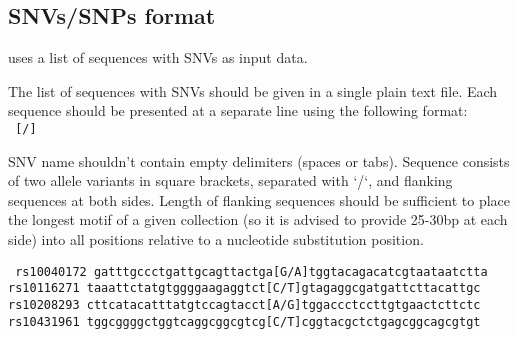 \subsection{SNVs/SNPs format}
 uses a list of sequences with SNVs as input data.

The list of sequences with SNVs should be given in a single plain text file. 
Each sequence should be presented at a separate line using the following format:\\
\texttt{ [/]}

SNV name shouldn't contain empty delimiters (spaces or tabs). 
Sequence consists of two allele variants in square brackets, separated with `/`, and flanking sequences at both sides. Length of flanking sequences should be sufficient to place the longest motif of a given collection (so it is advised to provide 25-30bp at each side) into all positions relative to a nucleotide substitution position. 

\noindent\texttt{%
rs10040172 gatttgccctgattgcagttactga[G/A]tggtacagacatcgtaataatctta
rs10116271 taaattctatgtggggaagaggtct[C/T]gtagaggcgatgattcttacattgc
rs10208293 cttcatacatttatgtccagtacct[A/G]tggaccctccttgtgaactcttctc
rs10431961 tggcggggctggtcaggcggcgtcg[C/T]cggtacgctctgagcggcagcgtgt
}
